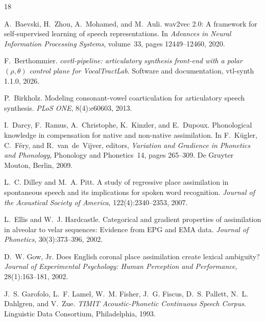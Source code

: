 \documentclass[11pt,a4paper]{article}
\begin{document}
\begin{thebibliography}{18}
\small

A.~Baevski, H.~Zhou, A.~Mohamed, and M.~Auli.
\newblock wav2vec 2.0: A framework for self-supervised learning of speech
  representations.
\newblock In \emph{Advances in Neural Information Processing Systems},
  volume~33, pages 12449--12460, 2020.

F.~Berthommier.
\newblock \emph{covtl-pipeline: articulatory synthesis front-end with a
  polar $(\rho,\theta)$ control plane for {V}ocal{T}ract{L}ab}.
\newblock Software and documentation, vtl-synth 1.1.0, 2026.

P.~Birkholz.
\newblock Modeling consonant-vowel coarticulation for articulatory speech
  synthesis.
\newblock \emph{PLoS ONE}, 8(4):e60603, 2013.

I.~Darcy, F.~Ramus, A.~Christophe, K.~Kinzler, and E.~Dupoux.
\newblock Phonological knowledge in compensation for native and non-native
  assimilation.
\newblock In F.~K\"ugler, C.~F\'ery, and R.~van~de~Vijver, editors,
  \emph{Variation and Gradience in Phonetics and Phonology}, Phonology and
  Phonetics~14, pages 265--309. De Gruyter Mouton, Berlin, 2009.

L.~C. Dilley and M.~A. Pitt.
\newblock A study of regressive place assimilation in spontaneous speech
  and its implications for spoken word recognition.
\newblock \emph{Journal of the Acoustical Society of America},
  122(4):2340--2353, 2007.

L.~Ellis and W.~J. Hardcastle.
\newblock Categorical and gradient properties of assimilation in alveolar
  to velar sequences: Evidence from {EPG} and {EMA} data.
\newblock \emph{Journal of Phonetics}, 30(3):373--396, 2002.

D.~W. Gow, Jr.
\newblock Does {E}nglish coronal place assimilation create lexical
  ambiguity?
\newblock \emph{Journal of Experimental Psychology: Human Perception and
  Performance}, 28(1):163--181, 2002.

J.~S. Garofolo, L.~F. Lamel, W.~M. Fisher, J.~G. Fiscus, D.~S. Pallett,
  N.~L. Dahlgren, and V.~Zue.
\newblock \emph{{TIMIT} Acoustic-Phonetic Continuous Speech Corpus}.
\newblock Linguistic Data Consortium, Philadelphia, 1993.


\end{thebibliography}
\end{document}
